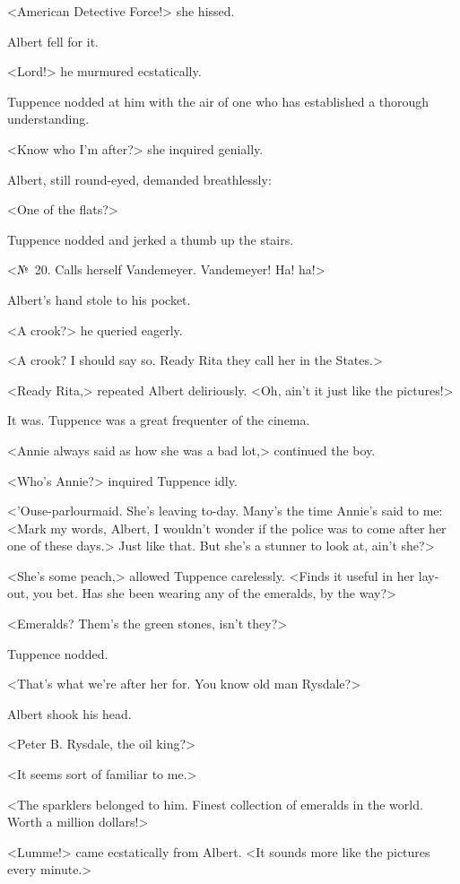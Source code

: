 <American Detective Force!> she hissed.

Albert fell for it.

<Lord!> he murmured ecstatically.

Tuppence nodded at him with the air of one who has established a thorough understanding.

<Know who I'm after?> she inquired genially.

Albert, still round-eyed, demanded breathlessly:

<One of the flats?>

Tuppence nodded and jerked a thumb up the stairs.

<№~20. Calls herself Vandemeyer. Vandemeyer! Ha! ha!>

Albert's hand stole to his pocket.

<A crook?> he queried eagerly.

<A crook? I should say so. Ready Rita they call her in the States.>

<Ready Rita,> repeated Albert deliriously. <Oh, ain't it just like the pictures!>

It was. Tuppence was a great frequenter of the cinema.

<Annie always said as how she was a bad lot,> continued the boy.

<Who's Annie?> inquired Tuppence idly.

<'Ouse-parlourmaid. She's leaving to-day. Many's the time Annie's said to me: <Mark my words, Albert, I wouldn't wonder if the police was to come after her one of these days.> Just like that. But she's a stunner to look at, ain't she?>

<She's some peach,> allowed Tuppence carelessly. <Finds it useful in her lay-out, you bet. Has she been wearing any of the emeralds, by the way?>

<Emeralds? Them's the green stones, isn't they?>

Tuppence nodded.

<That's what we're after her for. You know old man Rysdale?>

Albert shook his head.

<Peter B. Rysdale, the oil king?>

<It seems sort of familiar to me.>

<The sparklers belonged to him. Finest collection of emeralds in the world. Worth a million dollars!>

<Lumme!> came ecstatically from Albert. <It sounds more like the pictures every minute.>


